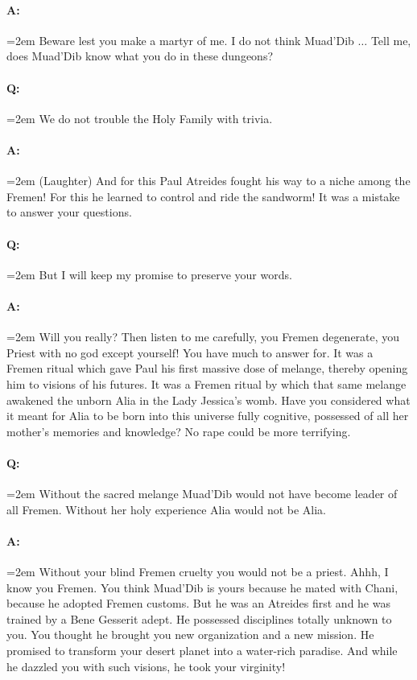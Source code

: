 \documentclass[a4paper, 12pt, oldfontcommands, final]{memoir}
\begin{document}
\paragraph{A:} \hangindent=2em Beware lest you make a martyr of me. I do not think Muad'Dib $\ldots$ Tell me, does Muad'Dib know what you do in these dungeons?
\paragraph{Q:} \hangindent=2em We do not trouble the Holy Family with trivia.
\paragraph{A:} \hangindent=2em (Laughter) And for this Paul Atreides fought his way to a niche among the Fremen! For this he learned to control and ride the sandworm! It was a mistake to answer your questions.
\paragraph{Q:} \hangindent=2em But I will keep my promise to preserve your words.
\paragraph{A:} \hangindent=2em Will you really? Then listen to me carefully, you Fremen degenerate, you Priest with no god except yourself! You have much to answer for. It was a Fremen ritual which gave Paul his first massive dose of melange, thereby opening him to visions of his futures. It was a Fremen ritual by which that same melange awakened the unborn Alia in the Lady Jessica's womb. Have you considered what it meant for Alia to be born into this universe fully cognitive, possessed of all her mother's memories and knowledge? No rape could be more terrifying.
\paragraph{Q:} \hangindent=2em Without the sacred melange Muad'Dib would not have become leader of all Fremen. Without her holy experience Alia would not be Alia.
\paragraph{A:} \hangindent=2em Without your blind Fremen cruelty you would not be a priest. Ahhh, I know you Fremen. You think Muad'Dib is yours because he mated with Chani, because he adopted Fremen customs. But he was an Atreides first and he was trained by a Bene Gesserit adept. He possessed disciplines totally unknown to you. You thought he brought you new organization and a new mission. He promised to transform your desert planet into a water-rich paradise. And while he dazzled you with such visions, he took your virginity!
\end{document}
